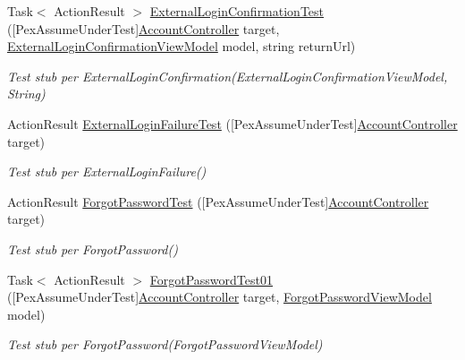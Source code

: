\begin{DoxyCompactItemize}
Task$<$ Action\+Result $>$ \mbox{\hyperlink{class_brew_day2_1_1_controllers_1_1_tests_1_1_account_controller_test_a1a46f604b4cf1a6a01f2bea9b418b8e8}{External\+Login\+Confirmation\+Test}} (\mbox{[}Pex\+Assume\+Under\+Test\mbox{]}\mbox{\hyperlink{class_brew_day2_1_1_controllers_1_1_account_controller}{Account\+Controller}} target, \mbox{\hyperlink{class_brew_day2_1_1_models_1_1_external_login_confirmation_view_model}{External\+Login\+Confirmation\+View\+Model}} model, string return\+Url)
\begin{DoxyCompactList}\small\item\em Test stub per External\+Login\+Confirmation(\+External\+Login\+Confirmation\+View\+Model, String)\end{DoxyCompactList}\item 
Action\+Result \mbox{\hyperlink{class_brew_day2_1_1_controllers_1_1_tests_1_1_account_controller_test_a793113ce1e8d0ccb05f472573a69b608}{External\+Login\+Failure\+Test}} (\mbox{[}Pex\+Assume\+Under\+Test\mbox{]}\mbox{\hyperlink{class_brew_day2_1_1_controllers_1_1_account_controller}{Account\+Controller}} target)
\begin{DoxyCompactList}\small\item\em Test stub per External\+Login\+Failure()\end{DoxyCompactList}\item 
Action\+Result \mbox{\hyperlink{class_brew_day2_1_1_controllers_1_1_tests_1_1_account_controller_test_a188cebb2cbbc503850337b52aede6c6c}{Forgot\+Password\+Test}} (\mbox{[}Pex\+Assume\+Under\+Test\mbox{]}\mbox{\hyperlink{class_brew_day2_1_1_controllers_1_1_account_controller}{Account\+Controller}} target)
\begin{DoxyCompactList}\small\item\em Test stub per Forgot\+Password()\end{DoxyCompactList}\item 
Task$<$ Action\+Result $>$ \mbox{\hyperlink{class_brew_day2_1_1_controllers_1_1_tests_1_1_account_controller_test_a4a8f98bcd6c18e26d7bada7911865793}{Forgot\+Password\+Test01}} (\mbox{[}Pex\+Assume\+Under\+Test\mbox{]}\mbox{\hyperlink{class_brew_day2_1_1_controllers_1_1_account_controller}{Account\+Controller}} target, \mbox{\hyperlink{class_brew_day2_1_1_models_1_1_forgot_password_view_model}{Forgot\+Password\+View\+Model}} model)
\begin{DoxyCompactList}\small\item\em Test stub per Forgot\+Password(\+Forgot\+Password\+View\+Model)\end{DoxyCompactList}\item 

\end{DoxyCompactItemize}
